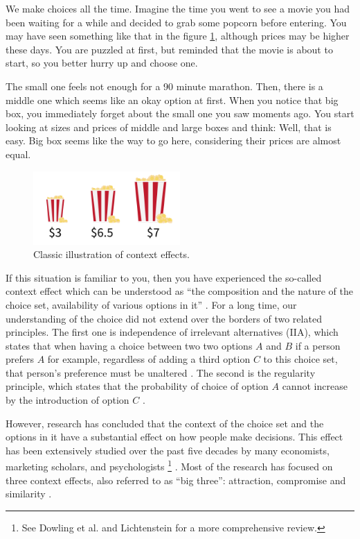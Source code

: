\documentclass[a4paper,12pt]{article}
\newcommand{\citeyearonly}[1]{\citeyearpar{#1}}
\begin{document}
We make choices all the time. Imagine the time you went to see a movie you had been waiting for a while and decided to grab some popcorn before entering. You may have seen something like that in the figure \ref{fig:decoyPopcornExample}, although prices may be higher these days. You are puzzled at first, but reminded that the movie is about to start, so you better hurry up and choose one. 

The small one feels not enough for a 90 minute marathon. Then, there is a middle one which seems like an okay option at first. When you notice that big box, you immediately forget about the small one you saw moments ago. You start looking at sizes and prices of middle and large boxes and think: Well, that is easy. Big box seems like the way to go here, considering their prices are almost equal. 


\begin{figure}[H]
    \centering
    \includegraphics[width=0.5\textwidth]{staticFiles/popcornDecoy.png}
    \caption{Classic illustration of context effects.}
    \label{fig:decoyPopcornExample}
\end{figure}

If this situation is familiar to you, then you have experienced the so-called context effect which can be understood as ``the composition and the nature of the choice set, availability of various options in it'' \citep{tversky1972elimination, huberPuto83}. For a long time, our understanding of the choice did not extend over the borders of two related principles. The first one is independence of irrelevant alternatives (IIA), which states that when having a choice between two two options $A$ and $B$ if a person prefers $A$ for example, regardless of adding a third option $C$ to this choice set, that person's preference must be unaltered \citep{luce59}. The second is the regularity principle, which states that the probability of choice of option $A$ cannot increase by the introduction of option $C$ \citep{luce59}.

However, research has concluded that the context of the choice set and the options in it have a substantial effect on how people make decisions. This effect has been extensively studied over the past five decades by many economists, marketing scholars, and psychologists \footnote{See Dowling et al. \citeyearonly{dowlingEtAl20} and Lichtenstein \citeyearonly{lichtenstein2006construction} for a more comprehensive review.} \citep{ kahnemanTversky79, simonson89, tverskySimonson93, lichtenstein2006construction, dowlingEtAl20}. Most of the research has focused on three context effects, also referred to as ``big three'': attraction, compromise and similarity \citep{howes2016contextual}.
\end{document}
